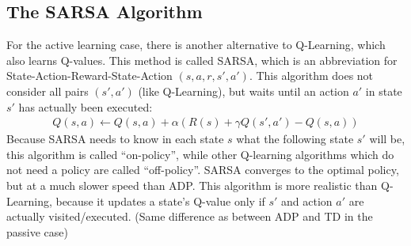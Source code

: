 \documentclass{llncs}
\begin{document}
\subsection{The SARSA Algorithm}
For the active learning case, there is another alternative to Q-Learning, which also learns Q-values. This method is called SARSA, which is an abbreviation for State-Action-Reward-State-Action $(s, a, r, s', a')$. This algorithm does not consider all pairs $(s',a')$ (like Q-Learning), but waits until an action $a'$ in state $s'$ has actually been executed:
\begin{align*}
	Q(s,a)\leftarrow Q(s,a)+\alpha(R(s)+\gamma Q(s',a')-Q(s,a))
\end{align*}
Because SARSA needs to know in each state $s$ what the following state $s'$ will be, this algorithm is called ``on-policy'', while other Q-learning algorithms which do not need a policy are called ``off-policy''. SARSA converges to the optimal policy, but at a much slower speed than ADP. This algorithm is more realistic than Q-Learning, because it updates a state's Q-value only if $s'$ and action $a'$ are actually visited/executed. (Same difference as between ADP and TD in the passive case)

\end{document}
